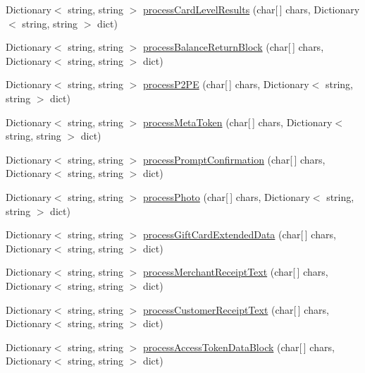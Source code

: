 \begin{DoxyCompactItemize}
\item 
Dictionary$<$ string, string $>$ \mbox{\hyperlink{class_form_sim_1_1_t_c_p_handler_aeaf47eddef345096f9e4db2c7b43592a}{process\+Card\+Level\+Results}} (char\mbox{[}$\,$\mbox{]} chars, Dictionary$<$ string, string $>$ dict)
\item 
Dictionary$<$ string, string $>$ \mbox{\hyperlink{class_form_sim_1_1_t_c_p_handler_a8edc653678104381cd77c4ec14808610}{process\+Balance\+Return\+Block}} (char\mbox{[}$\,$\mbox{]} chars, Dictionary$<$ string, string $>$ dict)
\item 
Dictionary$<$ string, string $>$ \mbox{\hyperlink{class_form_sim_1_1_t_c_p_handler_a1d7100333fad3bd76dd5abbff5b3cb9b}{process\+P2\+PE}} (char\mbox{[}$\,$\mbox{]} chars, Dictionary$<$ string, string $>$ dict)
\item 
Dictionary$<$ string, string $>$ \mbox{\hyperlink{class_form_sim_1_1_t_c_p_handler_a5eb9fa666902e313d7bb9ce9b73cbe7a}{process\+Meta\+Token}} (char\mbox{[}$\,$\mbox{]} chars, Dictionary$<$ string, string $>$ dict)
\item 
Dictionary$<$ string, string $>$ \mbox{\hyperlink{class_form_sim_1_1_t_c_p_handler_a8514434e5adb697c056d93f73aa849df}{process\+Prompt\+Confirmation}} (char\mbox{[}$\,$\mbox{]} chars, Dictionary$<$ string, string $>$ dict)
\item 
Dictionary$<$ string, string $>$ \mbox{\hyperlink{class_form_sim_1_1_t_c_p_handler_a17a26019d7633bcf35bdfc3be4c6b913}{process\+Photo}} (char\mbox{[}$\,$\mbox{]} chars, Dictionary$<$ string, string $>$ dict)
\item 
Dictionary$<$ string, string $>$ \mbox{\hyperlink{class_form_sim_1_1_t_c_p_handler_a767ff9ebb96f4da75c07d687fd71c2e7}{process\+Gift\+Card\+Extended\+Data}} (char\mbox{[}$\,$\mbox{]} chars, Dictionary$<$ string, string $>$ dict)
\item 
Dictionary$<$ string, string $>$ \mbox{\hyperlink{class_form_sim_1_1_t_c_p_handler_a7b39975f803ae5028bdfb874c6a9bb9c}{process\+Merchant\+Receipt\+Text}} (char\mbox{[}$\,$\mbox{]} chars, Dictionary$<$ string, string $>$ dict)
\item 
Dictionary$<$ string, string $>$ \mbox{\hyperlink{class_form_sim_1_1_t_c_p_handler_a45bb968cfd37e158b642677568096813}{process\+Customer\+Receipt\+Text}} (char\mbox{[}$\,$\mbox{]} chars, Dictionary$<$ string, string $>$ dict)
\item 
Dictionary$<$ string, string $>$ \mbox{\hyperlink{class_form_sim_1_1_t_c_p_handler_aedf978802bf4fee2c7b7529935da5bf3}{process\+Access\+Token\+Data\+Block}} (char\mbox{[}$\,$\mbox{]} chars, Dictionary$<$ string, string $>$ dict)

\end{DoxyCompactItemize}
